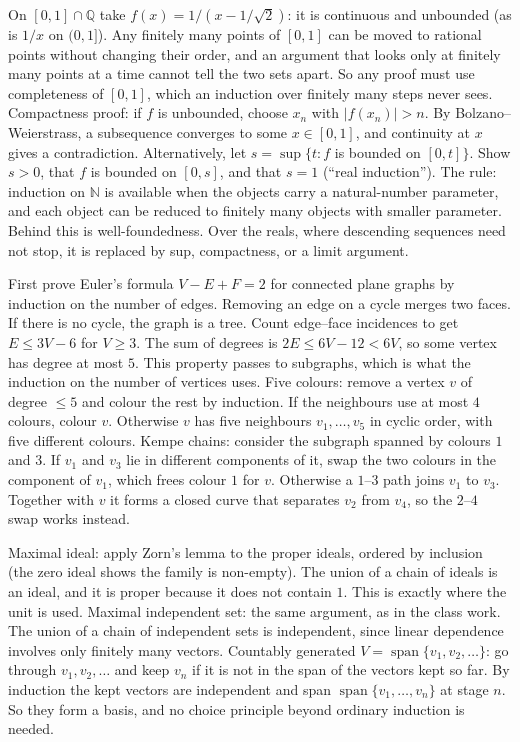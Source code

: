 \documentclass[11pt,a4paper]{article}
\begin{document}
 On $[0,1]\cap\mathbb Q$ take $f(x)=1/(x-1/\sqrt2)$: it is continuous and unbounded (as is $1/x$ on $(0,1]$). Any finitely many points of $[0,1]$ can be moved to rational points without changing their order, and an argument that looks only at finitely many points at a time cannot tell the two sets apart. So any proof must use completeness of $[0,1]$, which an induction over finitely many steps never sees.
 Compactness proof: if $f$ is unbounded, choose $x_n$ with $|f(x_n)|>n$. By Bolzano--Weierstrass, a subsequence converges to some $x\in[0,1]$, and continuity at $x$ gives a contradiction. Alternatively, let $s=\sup\{t:f$ is bounded on $[0,t]\}$. Show $s>0$, that $f$ is bounded on $[0,s]$, and that $s=1$ (``real induction'').
 The rule: induction on $\mathbb N$ is available when the objects carry a natural-number parameter, and each object can be reduced to finitely many objects with smaller parameter. Behind this is well-foundedness. Over the reals, where descending sequences need not stop, it is replaced by sup, compactness, or a limit argument.

 First prove Euler's formula $V-E+F=2$ for connected plane graphs by induction on the number of edges. Removing an edge on a cycle merges two faces. If there is no cycle, the graph is a tree. Count edge--face incidences to get $E\le3V-6$ for $V\ge3$.
 The sum of degrees is $2E\le6V-12<6V$, so some vertex has degree at most $5$. This property passes to subgraphs, which is what the induction on the number of vertices uses.
 Five colours: remove a vertex $v$ of degree $\le5$ and colour the rest by induction. If the neighbours use at most $4$ colours, colour $v$. Otherwise $v$ has five neighbours $v_1,\dots,v_5$ in cyclic order, with five different colours.
 Kempe chains: consider the subgraph spanned by colours $1$ and $3$. If $v_1$ and $v_3$ lie in different components of it, swap the two colours in the component of $v_1$, which frees colour $1$ for $v$. Otherwise a $1$--$3$ path joins $v_1$ to $v_3$. Together with $v$ it forms a closed curve that separates $v_2$ from $v_4$, so the $2$--$4$ swap works instead.

 Maximal ideal: apply Zorn's lemma to the proper ideals, ordered by inclusion (the zero ideal shows the family is non-empty). The union of a chain of ideals is an ideal, and it is proper because it does not contain $1$. This is exactly where the unit is used.
 Maximal independent set: the same argument, as in the class work. The union of a chain of independent sets is independent, since linear dependence involves only finitely many vectors.
 Countably generated $V=\operatorname{span}\{v_1,v_2,\dots\}$: go through $v_1,v_2,\dots$ and keep $v_n$ if it is not in the span of the vectors kept so far. By induction the kept vectors are independent and span $\operatorname{span}\{v_1,\dots,v_n\}$ at stage $n$. So they form a basis, and no choice principle beyond ordinary induction is needed.
\end{document}
